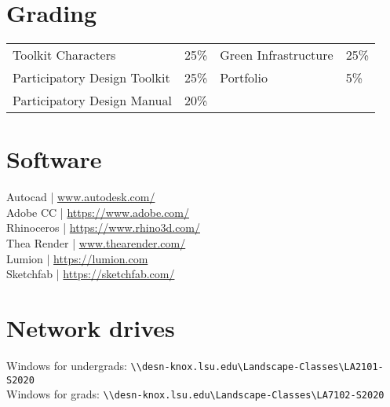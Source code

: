 \documentclass[11pt,article,oneside]{memoir}
\begin{document}
\section{Grading}

\begin{table}[H]
\begin{tabular}{l r @{\hskip 2cm} l @{\hskip 0.5cm} l}

Toolkit Characters & 25\% & Green Infrastructure & 25\% \\
Participatory Design Toolkit & 25\% & Portfolio & 5\% \\
Participatory Design Manual & 20\%\\
\end{tabular}
\end{table}

\clearpage

\section{Software}
\begin{multicols}{2}
\raggedright
Autocad | \url{www.autodesk.com/‎}\\
Adobe CC | \url{https://www.adobe.com/}\\
Rhinoceros | \url{https://www.rhino3d.com/}\\
Thea Render | \url{www.thearender.com/}\\
Lumion | \url{https://lumion.com}\\
Sketchfab | \url{https://sketchfab.com/}\\
\end{multicols}

\section{Network drives}


\noindent
Windows for undergrads: \verb|\\desn-knox.lsu.edu\Landscape-Classes\LA2101-S2020| \\
Windows for grads: \verb|\\desn-knox.lsu.edu\Landscape-Classes\LA7102-S2020| \\
\end{document}
